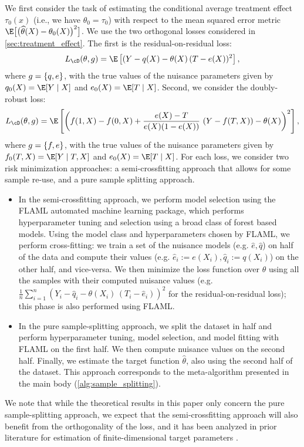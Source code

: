 \documentclass[11pt]{article} %
\newcommand{\pref}[1]{\cref{#1}}
\theoremstyle{theorem}  %
\theoremstyle{plain}
\DeclarePairedDelimiter{\brk}{[}{]}
\DeclarePairedDelimiter{\crl}{\{}{\}}
\DeclarePairedDelimiter{\prn}{(}{)}
\newcommand{\wh}[1]{\widehat{#1}}
\newcommand{\poprisk}{L_{\cD}}
\renewcommand{\hat}[1]{\wh{#1}}
\begin{document}
We first consider the task of estimating the conditional average treatment effect $\tau_0(x)$ (i.e., we have $\theta_0=\tau_0$) with respect to the mean squared error metric $\E\brk[\big]{\prn[\big]{\hat{\theta}(X)-\theta_0(X)}^2}$. We use the two orthogonal losses considered in \pref{sec:treatment_effect}. The first is the residual-on-residual loss:
\begin{align}
    \poprisk(\theta,g) = \E\left[(Y - q(X) - \theta(X)\, (T - e(X))^2\right],
\end{align}
where $g=\crl{q,e}$, with the true values of the nuisance parameters given by $q_0(X)=\E[Y\mid X]$ and $e_0(X)=\E[T\mid X]$. Second, we consider the doubly-robust loss:
\begin{align}
    \poprisk(\theta,g) = \E\left[\left(f(1, X) - f(0, X) + \frac{e(X)-T}{e(X) (1 - e(X))}\, \left(Y - f(T, X)\right) - \theta(X)\right)^2\right],
\end{align}
where $g=\crl{f,e}$, with the true values of the nuisance parameters given by $f_0(T, X)=\E[Y\mid T, X]$ and $e_0(X)=\E[T\mid X]$. For each loss, we consider two risk minimization approaches: a semi-crossfitting approach that allows for some sample re-use, and a pure sample splitting approach.
\begin{itemize}
\item In the semi-crossfitting approach, we perform model selection using the FLAML \citep{wang2021flaml} automated machine learning package, which performs hyperparameter tuning and selection using a broad class of forest based models. Using the model class and hyperparameters chosen by FLAML, we perform cross-fitting: we train a set of the nuisance models (e.g. $\hat{e}, \hat{q}$) on half of the data and compute their values (e.g. $\hat{e}_i := e(X_i), \hat{q}_i := q(X_i)$) on the other half, and vice-versa. We then minimize the loss function over $\theta$ using all the samples with their computed nuisance values (e.g. $\frac{1}{n}\sum_{i=1}^n (Y_i - \hat{q}_i - \theta(X_i)\, (T_i - \hat{e}_i))^2$ for the residual-on-residual loss); this phase is also performed using FLAML.
\item In the pure sample-splitting approach, we split the dataset in half and perform hyperparameter tuning, model selection, and model fitting with FLAML on the first half. We then compute nuisance values on the second half. Finally, we estimate the target function $\hat{\theta}$, also using the second half of the dataset. This approach corresponds to the meta-algorithm presented in the main body (\pref{alg:sample_splitting}). 
\end{itemize}
We note that while the theoretical results in this paper only concern the pure sample-splitting approach, we expect that the semi-crossfitting approach will also benefit from the orthogonality of the loss, and it has been analyzed in prior literature for estimation of finite-dimensional target parameters \citep{chernozhukov2016double}.
%
\end{document}
